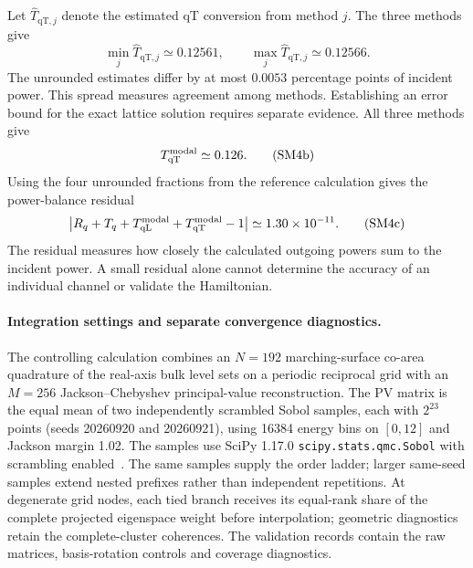 \documentclass[10pt,aps,onecolumn,notitlepage,nofootinbib]{revtex4-2}
\newcommand{\qT}{\mathrm{qT}}
\newcommand{\qL}{\mathrm{qL}}
\begin{document}
Let $\widehat T_{\qT,j}$ denote the estimated qT conversion from method $j$. The three methods give
\begin{equation*}
 \min_j\widehat T_{\qT,j}\simeq0.12561,\qquad \max_j\widehat T_{\qT,j}\simeq0.12566.
 \tag{SM4a}\label{eq:s6-central-range}
\end{equation*}
The unrounded estimates differ by at most $0.0053$ percentage points of incident power. This spread measures agreement among methods. Establishing an error bound for the exact lattice solution requires separate evidence. All three methods give
\begin{equation*}
 T_{\qT}^{\rm modal}\simeq0.126.
 \tag{SM4b}\label{eq:s6-headline}
\end{equation*}
Using the four unrounded fractions from the reference calculation gives the power-balance residual
\begin{equation*}
 \left|R_q+T_q+T_{\qL}^{\rm modal}+T_{\qT}^{\rm modal}-1\right|
 \simeq1.30\times10^{-11}.
 \tag{SM4c}\label{eq:s6-closure}
\end{equation*}
The residual measures how closely the calculated outgoing powers sum to the incident power. A small residual alone cannot determine the accuracy of an individual channel or validate the Hamiltonian.

\paragraph*{Integration settings and separate convergence diagnostics.}

The controlling calculation combines an $N=192$ marching-surface co-area quadrature of the real-axis bulk level sets on a periodic reciprocal grid with an $M=256$ Jackson--Chebyshev principal-value reconstruction. The PV matrix is the equal mean of two independently scrambled Sobol samples, each with $2^{23}$ points (seeds 20260920 and 20260921), using 16384 energy bins on $[0,12]$ and Jackson margin 1.02. The samples use SciPy 1.17.0 \texttt{scipy.stats.qmc.Sobol} with scrambling enabled~\cite{SciPy2020}. The same samples supply the order ladder; larger same-seed samples extend nested prefixes rather than independent repetitions. At degenerate grid nodes, each tied branch receives its equal-rank share of the complete projected eigenspace weight before interpolation; geometric diagnostics retain the complete-cluster coherences. The validation records contain the raw matrices, basis-rotation controls and coverage diagnostics.
\end{document}
